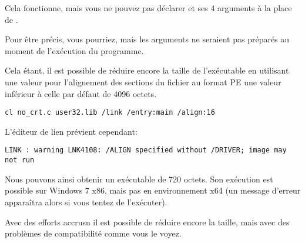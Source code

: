 Cela fonctionne, mais vous ne pouvez pas déclarer  et ses 4 arguments à la place de 
\main{}.

Pour être précis, vous pourriez, mais les arguments ne seraient pas préparés au moment de 
l'exécution du programme.

Cela étant, il est possible de réduire encore la taille de l'exécutable en utilisant une valeur 
pour l'alignement des sections du fichier au format \ac{PE} une valeur inférieur à celle par 
défaut de 4096 octets.

\begin{lstlisting}
cl no_crt.c user32.lib /link /entry:main /align:16
\end{lstlisting}

L'éditeur de lien prévient cependant:

\begin{lstlisting}
LINK : warning LNK4108: /ALIGN specified without /DRIVER; image may not run
\end{lstlisting}

Nous pouvons ainsi obtenir un exécutable de 720 octets.
Son exécution est possible sur Windows 7 x86, mais pas en environnement x64 
(un message d'erreur apparaîtra alors si vous tentez de l'exécuter).

Avec des efforts accrusn il est possible de réduire encore la taille, mais avec des problèmes de
compatibilité comme vous le voyez.
